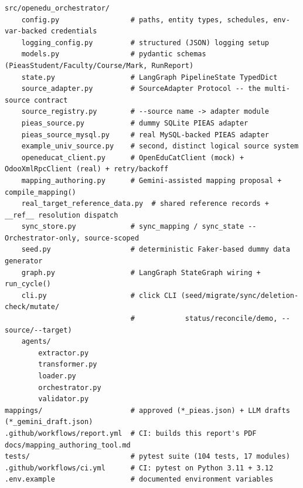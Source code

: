 \documentclass[11pt,a4paper]{article}
\begin{document}
\begin{lstlisting}[style=termstyle,basicstyle=\ttfamily\scriptsize\color{white}]
src/openedu_orchestrator/
    config.py                 # paths, entity types, schedules, env-var-backed credentials
    logging_config.py         # structured (JSON) logging setup
    models.py                 # pydantic schemas (PieasStudent/Faculty/Course/Mark, RunReport)
    state.py                  # LangGraph PipelineState TypedDict
    source_adapter.py         # SourceAdapter Protocol -- the multi-source contract
    source_registry.py        # --source name -> adapter module
    pieas_source.py           # dummy SQLite PIEAS adapter
    pieas_source_mysql.py     # real MySQL-backed PIEAS adapter
    example_univ_source.py    # second, distinct logical source system
    openeducat_client.py      # OpenEduCatClient (mock) + OdooXmlRpcClient (real) + retry/backoff
    mapping_authoring.py      # Gemini-assisted mapping proposal + compile_mapping()
    real_target_reference_data.py  # shared reference records + __ref__ resolution dispatch
    sync_store.py             # sync_mapping / sync_state -- Orchestrator-only, source-scoped
    seed.py                   # deterministic Faker-based dummy data generator
    graph.py                  # LangGraph StateGraph wiring + run_cycle()
    cli.py                    # click CLI (seed/migrate/sync/deletion-check/mutate/
                              #            status/reconcile/demo, --source/--target)
    agents/
        extractor.py
        transformer.py
        loader.py
        orchestrator.py
        validator.py
mappings/                     # approved (*_pieas.json) + LLM drafts (*_gemini_draft.json)
.github/workflows/report.yml  # CI: builds this report's PDF
docs/mapping_authoring_tool.md
tests/                        # pytest suite (104 tests, 17 modules)
.github/workflows/ci.yml      # CI: pytest on Python 3.11 + 3.12
.env.example                  # documented environment variables
\end{lstlisting}
\end{document}

